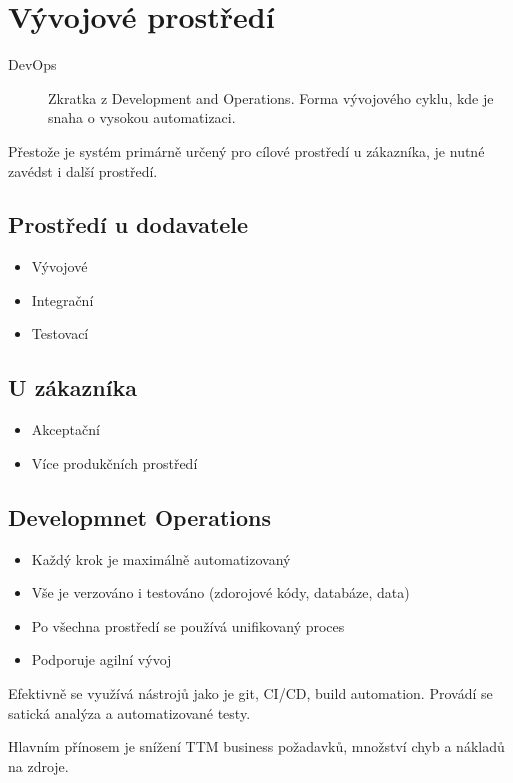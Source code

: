 \section{Vývojové prostředí}
  \begin{description}
    \item[DevOps] Zkratka z Development and Operations. Forma vývojového cyklu, kde je snaha o vysokou automatizaci.
  \end{description}
  Přestože je systém primárně určený pro cílové prostředí u zákazníka, je nutné zavédst i další prostředí.

  \subsection{Prostředí u dodavatele}
    \begin{itemize}
      \item Vývojové
      \item Integrační
      \item Testovací
    \end{itemize}

  \subsection{U zákazníka}
    \begin{itemize}
      \item Akceptační
      \item Více produkčních prostředí
    \end{itemize}

  \subsection{Developmnet Operations}
    \begin{itemize}
      \item Každý krok je maximálně automatizovaný
      \item Vše je verzováno i testováno (zdorojové kódy, databáze, data)
      \item Po všechna prostředí se používá unifikovaný proces
      \item Podporuje agilní vývoj
    \end{itemize}

    Efektivně se využívá nástrojů jako je git, CI/CD, build automation. Provádí se satická analýza a automatizované testy.

    Hlavním přínosem je snížení TTM business požadavků, množství chyb a nákladů na zdroje.
